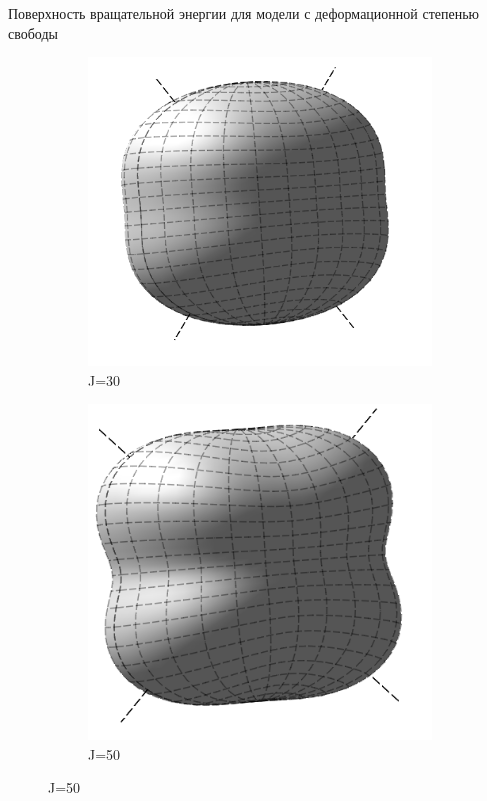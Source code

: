 \documentclass[hyperref={pdfpagelabels=false},usepdftitle=false, xcolor = dvipsnames]{beamer}
\begin{document}
\begin{frame}{Поверхность вращательной энергии для модели с деформационной степенью свободы}
\begin{varblock}[11cm]{}
\begin{figure}
\begin{subfigure}{0.3\textwidth}
		  \includegraphics[width=\textwidth]{../pictures/Rigid_RES_30.png}
		  \caption{J=30}
		\end{subfigure}
		\begin{subfigure}{0.3\textwidth}
		  \includegraphics[width=\textwidth]{../pictures/Rigid_RES_50.png}
		  \caption{J=50}
		\end{subfigure}  
	  \end{figure}
  \end{varblock}    
\end{frame}
\end{document}
